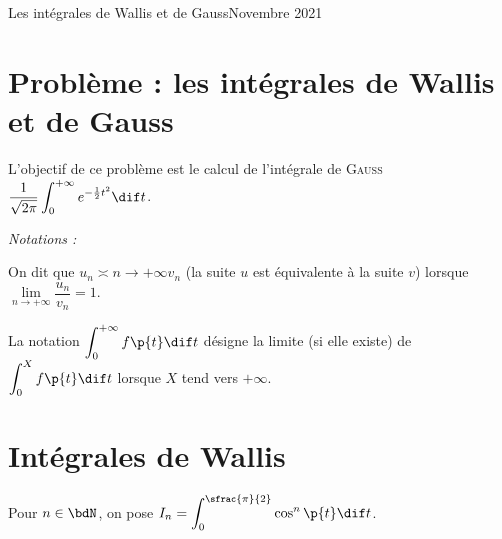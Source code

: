 \documentclass[a4paper,french,bookmarks]{article}
\begin{document}
    \def\classevar{MP2I}
    \def\anneevar{2021-2022}
    \newboxans{}

    \renewcommand{\thesection}{\Roman{section}}
    \renewcommand{\thesection}{Partie \Roman{section}}
    \renewcommand{\labelenumi}{\Roman{section}.\arabic{enumi}.}
    \renewcommand*{\labelenumii}{\alph{enumii}.}

    {Les intégrales de Wallis et de Gauss}{Novembre 2021}

    \section*{Problème : les intégrales de Wallis et de Gauss}

    L'objectif de ce problème est le calcul de l'intégrale de \textsc{Gauss} $\displaystyle \dfrac{1}{\sqrt{2\pi}} \int_0^{+\infty} e^{-\frac{1}{2}t^2} \dif t$.

    \emph{Notations :}
    \begin{enumerate}
        \itt On dit que $u_n \asymp{n \to +\infty} v_n$ (la suite $u$ est équivalente à la suite $v$) lorsque $\lim\limits_{n \to +\infty} \dfrac{u_n}{v_n} = 1$.
    
        \itt La notation $\displaystyle \int_0^{+\infty} f\p{t}\dif t$ désigne la limite (si elle existe) de $\displaystyle \int_0^X f\p{t}\dif t$ lorsque $X$ tend vers $+\infty$.
    \end{enumerate}

    \section{Intégrales de Wallis}

    Pour $n \in \bdN$, on pose $\displaystyle I_n = \int_0^{\sfrac{\pi}{2}} \cos^n\p{t} \dif t$.
\end{document}
